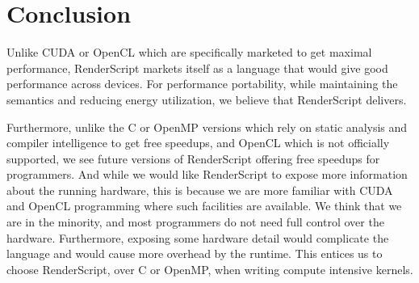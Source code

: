 \section{Conclusion}
\label{sec:conclusion}

Unlike CUDA or OpenCL which are specifically marketed to get maximal performance, 
RenderScript markets itself as a language that would give good performance across devices.
For performance portability, while maintaining the semantics and reducing energy utilization,
	we believe that RenderScript delivers.

Furthermore, unlike the C or OpenMP versions which rely on static analysis and compiler
	intelligence to get free speedups, and OpenCL which is not officially supported,
	we see future versions of RenderScript offering free speedups for programmers.
And while we would like RenderScript to expose more information about the running hardware,
	this is because we are more familiar with CUDA and OpenCL programming where such facilities
	are available.
We think that we are in the minority, and most programmers do not need full control over the hardware.
Furthermore, exposing some hardware detail would complicate the language and would cause
	more overhead by the runtime.
This entices us to choose RenderScript, over C or OpenMP, when writing compute intensive
	kernels.
